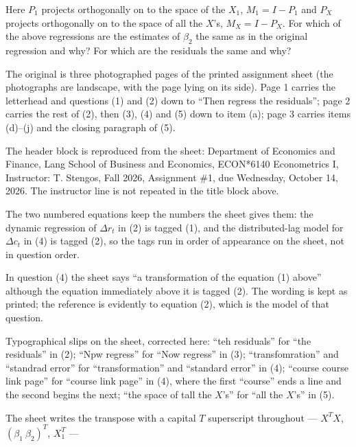 \documentclass[11pt]{article}
\begin{document}
Here $P_{1}$ projects orthogonally on to the space of the $X_{1}$,
$M_{1} = I - P_{1}$ and $P_{X}$ projects orthogonally on to the space of all the
$X$'s, $M_{X} = I - P_{X}$. For which of the above regressions are the estimates
of $\beta_{2}$ the same as in the original regression and why? For which are the
residuals the same and why?

\begin{transcriptnotes}
  \item The original is three photographed pages of the printed assignment sheet
        (the photographs are landscape, with the page lying on its side). Page 1
        carries the letterhead and questions (1) and (2) down to ``Then regress
        the residuals''; page 2 carries the rest of (2), then (3), (4) and (5)
        down to item (a); page 3 carries items (d)--(j) and the closing
        paragraph of (5).
  \item The header block is reproduced from the sheet: Department of Economics
        and Finance, Lang School of Business and Economics, ECON*6140
        Econometrics I, Instructor: T. Stengos, Fall 2026, Assignment \#1, due
        Wednesday, October 14, 2026. The instructor line is not repeated in the
        title block above.
  \item The two numbered equations keep the numbers the sheet gives them: the
        dynamic regression of $\Delta r_{t}$ in (2) is tagged (1), and the
        distributed-lag model for $\Delta c_{t}$ in (4) is tagged (2), so the
        tags run in order of appearance on the sheet, not in question order.
  \item In question (4) the sheet says ``a transformation of the equation (1)
        above'' although the equation immediately above it is tagged (2). The
        wording is kept as printed; the reference is evidently to equation (2),
        which is the model of that question.
  \item Typographical slips on the sheet, corrected here: ``teh residuals'' for
        ``the residuals'' in (2); ``Npw regress'' for ``Now regress'' in (3);
        ``transfomration'' and ``standrad error'' for ``transformation'' and
        ``standard error'' in (4); ``course course link page'' for ``course link
        page'' in (4), where the first ``course'' ends a line and the second
        begins the next; ``the space of tall the $X$'s'' for ``all the $X$'s''
        in (5).
  \item The sheet writes the transpose with a capital $T$ superscript
        throughout --- $X^{T}X$, $(\beta_{1}\ \beta_{2})^{T}$, $X_{1}^{T}$ ---

\end{transcriptnotes}
\end{document}
